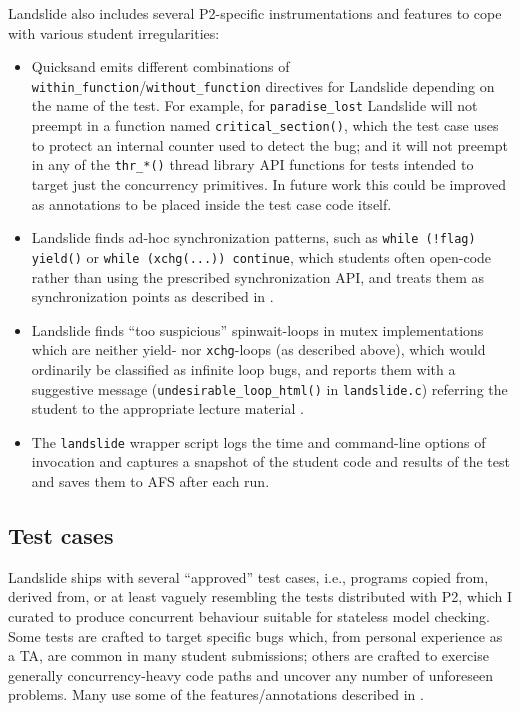 \noindent Landslide also includes several P2-specific instrumentations and features to cope with various student irregularities:
\begin{itemize}
	\item Quicksand emits different combinations of {\tt within\_function}/{\tt without\_function} directives
		for Landslide depending on the name of the test.
		For example, for {\tt paradise\_\allowbreak{}lost} Landslide will not preempt in a function named {\tt critical\_section()},
		which the test case uses to protect an internal counter used to detect the bug;
		and it will not preempt in any of the {\tt thr\_*()} thread library API functions
		for tests intended to target just the concurrency primitives.
		In future work this could be improved as annotations to be placed inside the test case code itself.
	\item Landslide finds ad-hoc synchronization patterns,
		such as {\tt while (!flag) yield()} or {\tt while (xchg(...)) continue},
		which students often open-code rather than using the prescribed synchronization API,
		and treats them as synchronization points as described in \sect{\ref{sec:landslide-blocking}}.
	\item Landslide finds ``too suspicious'' spinwait-loops in mutex implementations
		which are neither yield- nor {\tt xchg}-loops (as described above),
		which would ordinarily be classified as infinite loop bugs,
		and reports them with a suggestive message ({\tt undesirable\_\allowbreak{}loop\_html()} in {\tt landslide.c})
		referring the student to the appropriate lecture material
		\cite{synchronization-2}.
	\item The {\tt landslide} wrapper script logs the time and command-line options of invocation
		and captures a snapshot of the student code and results of the test and saves them to AFS after each run.
\end{itemize}

\subsection{Test cases}
\label{sec:education-pebbles-tests}

Landslide ships with several ``approved'' test cases,
i.e., programs copied from, derived from, or at least vaguely resembling
the tests distributed with P2,
which I curated to produce concurrent behaviour suitable for stateless model checking.
Some tests are crafted to target specific bugs which,
from personal experience as a TA, are common in many student submissions;
others are crafted to exercise generally concurrency-heavy code paths and uncover any number of unforeseen problems.
Many use some of the features/annotations described in \sect{\ref{sec:landslide-testcases}}.

